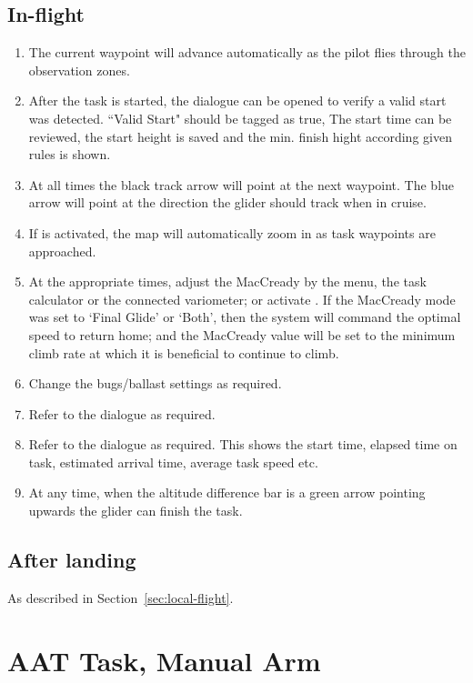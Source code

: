 \subsection*{In-flight}
\begin{enumerate}
\item  The current waypoint will advance automatically as the pilot flies
  through the observation zones.  
\item  After the task is started, the  dialogue can be opened to
  verify a valid start was detected.  ``Valid Start" should be tagged as true,
  The start time can be reviewed, the start height is saved and the min. finish
  hight according given rules is shown.
\item  At all times the black track arrow will point at the next waypoint.  The
  blue arrow will point at the direction the glider should track when in cruise.
\item  If  is activated, the map will automatically zoom in as
  task waypoints are approached.
\item  At the appropriate times, adjust the MacCready by the menu,
  the task calculator or the connected variometer; or activate .
  If the MacCready mode was set to `Final Glide' or `Both', then the system will 
  command the optimal speed to return home; and the MacCready value will be set 
  to the minimum climb rate at which it is beneficial to continue to climb.
\item  Change the bugs/ballast settings as required.
\item  Refer to the  dialogue as required. 
\item  Refer to the  dialogue as required.  This shows the start
  time, elapsed time on task, estimated arrival time, average task speed etc.
\item  At any time, when the altitude difference bar is a green arrow pointing 
  upwards the glider can finish the task.

\end{enumerate}

\subsection*{After landing}
As described in Section~\ref{sec:local-flight}.


\section{AAT Task, Manual Arm}\label{sec:aat-task-manual}

